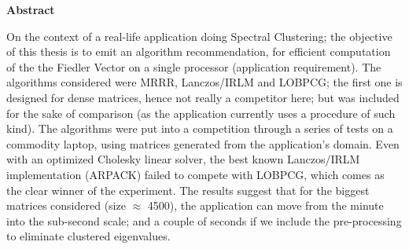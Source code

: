 \thispagestyle{plain}
\begin{center}

  \vspace{0.4cm}


  \vspace{0.9cm}
  \textbf{Abstract}
\end{center}

    On the context of a real-life application doing Spectral
    Clustering; the objective of this thesis is to emit an algorithm
    recommendation, for efficient 
    computation of the the Fiedler Vector on a single processor
    (application requirement). The algorithms considered were
    MRRR, Lanczos/IRLM and LOBPCG; the first one is designed for dense
    matrices, hence not really a competitor here; but was 
    included for the sake of comparison (as the application currently
    uses a procedure of such kind). The algorithms were put into
    a competition through a series of tests on a commodity laptop, 
    using matrices generated from the application's domain. Even with
    an optimized Cholesky linear solver, the best known Lanczos/IRLM
    implementation (ARPACK) failed to compete with LOBPCG, which comes
    as the clear winner of the experiment. The results suggest that
    for the biggest matrices considered (size $\approx$ 4500), the application can
    move from the minute into the sub-second scale; and a couple of seconds if we include the pre-processing to eliminate clustered eigenvalues.
